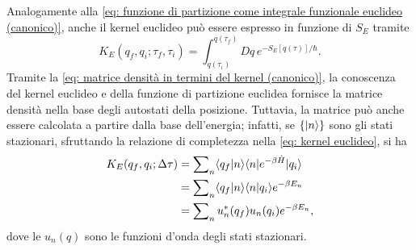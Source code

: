 Analogamente alla \eqref{eq: funzione di partizione come integrale funzionale euclideo (canonico)}, anche il kernel euclideo può essere espresso in funzione di $S_E$ tramite
\begin{equation}
\label{eq: kernel euclideo come integrale funzionale}
    K_E(q_f,q_i;\tau_f,\tau_i) = \int_{q(\tau_i)}^{q(\tau_f)} Dq\,e^{-S_E[q(\tau)]/\hbar}.
\end{equation}
Tramite la \eqref{eq: matrice densità in termini del kernel (canonico)}, la conoscenza del kernel euclideo e della funzione di partizione euclidea fornisce la matrice densità nella base degli autostati della posizione. Tuttavia, la matrice può anche essere calcolata a partire dalla base dell'energia; infatti, se $\{\ket{n}\}$ sono gli stati stazionari, sfruttando la relazione di completezza nella \eqref{eq: kernel euclideo}, si ha
\begin{equation}
\label{eq: kernel in termini delle funzioni d'onda stati stazionari (canonico)}
    \begin{split}
        K_E(q_f,q_i;\Delta\tau) &= \sum\nolimits_n\langle q_f | n \rangle\langle n | e^{-\beta\hat{H}} | q_i \rangle \\
        &= \sum\nolimits_n\langle q_f | n \rangle\langle n | q_i \rangle e^{-\beta E_n} \\
        &= \sum\nolimits_n u^*_n(q_f)u_n(q_i)e^{-\beta E_n},
    \end{split}
\end{equation}
dove le $u_n(q)$ sono le funzioni d'onda degli stati stazionari.
